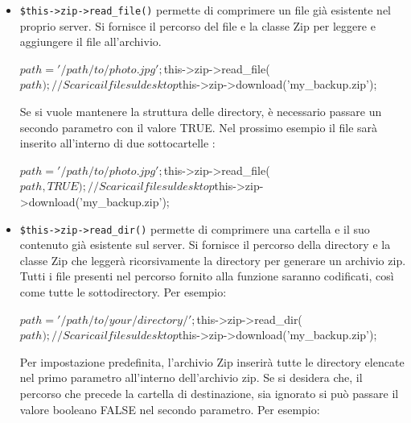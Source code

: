 \begin{itemize}

\item \verb|$this->zip->read_file()| permette di comprimere un file già esistente nel proprio server. Si fornisce il percorso del file e la classe Zip per leggere e aggiungere il file all'archivio.

\begin{code}
$path = '/path/to/photo.jpg';

$this->zip->read_file($path); 

// Scarica il file sul desktop
$this->zip->download('my_backup.zip');
\end{code}

Se si vuole mantenere la struttura delle directory, è necessario passare un secondo parametro con il valore TRUE. Nel prossimo esempio il file  sarà inserito all'interno di due sottocartelle :

\begin{code}
$path = '/path/to/photo.jpg';

$this->zip->read_file($path, TRUE); 

// Scarica il file sul desktop
$this->zip->download('my_backup.zip');
\end{code}

\item \verb|$this->zip->read_dir()| permette di comprimere una cartella e il suo contenuto già esistente sul server. Si fornisce il percorso della directory e la classe Zip che leggerà ricorsivamente la directory per generare un archivio zip. Tutti i file presenti nel percorso fornito alla funzione saranno codificati, così come tutte le sottodirectory. Per esempio:

\begin{code}
$path = '/path/to/your/directory/';

$this->zip->read_dir($path); 

// Scarica il file sul desktop
$this->zip->download('my_backup.zip');
\end{code}

Per impostazione predefinita, l'archivio Zip inserirà tutte le directory elencate nel primo parametro all'interno dell'archivio zip. Se si desidera che, il percorso che precede la cartella di destinazione, sia ignorato si può passare il valore booleano FALSE nel secondo parametro. Per esempio:


\end{itemize}
